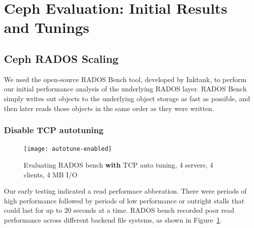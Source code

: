 \section{Ceph Evaluation: Initial Results and Tunings}
\label{sec:ceph-initial}

\subsection{Ceph RADOS Scaling}


%
%

We used the open-source RADOS Bench tool, developed by Inktank, to perform our
initial performance analysis of the underlying RADOS layer.  RADOS Bench simply
writes out objects to the underlying object storage as fast as possible, and
then later reads those objects in the same order as they were written.

\subsubsection{Disable TCP autotuning}

\begin{figure}[htb]
\centering
\texttt{[image: autotune-enabled]}
\caption{Evaluating RADOS bench \textbf{with} TCP auto tuning, 4 servers, 4
clients, 4 MB I/O}
\label{fig:rados-tcp-autotune}
\end{figure}

Our early testing indicated a read performace abberation.  There were periods of high performance followed by
periods of low performance or outright stalls that could last for up to 20
seconds at a time.  RADOS bench recorded poor read performance across
different backend file systems, as shown in
Figure~\ref{fig:rados-tcp-autotune}.


